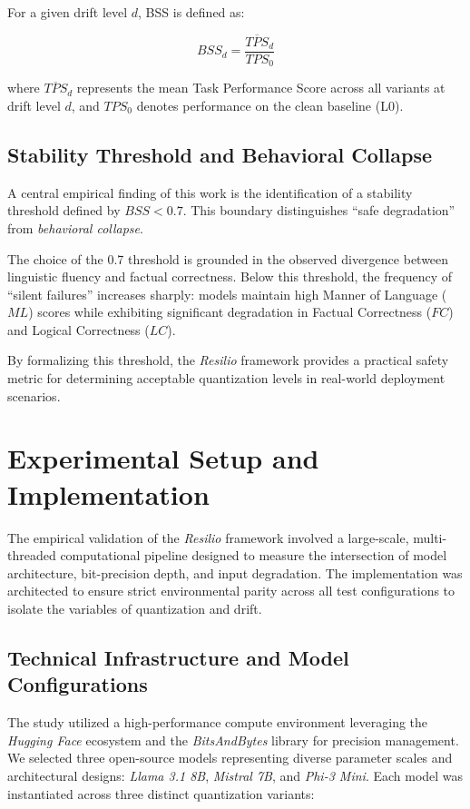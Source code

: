 \documentclass[conference]{IEEEtran}
\begin{document}
For a given drift level $d$, BSS is defined as:

\begin{equation}
BSS_d = \frac{\overline{TPS}_d}{TPS_0}
\end{equation}

where $\overline{TPS}_d$ represents the mean Task Performance Score across all variants at drift level $d$, and $TPS_0$ denotes performance on the clean baseline (L0).

\subsection{Stability Threshold and Behavioral Collapse}

A central empirical finding of this work is the identification of a stability threshold defined by $BSS < 0.7$. This boundary distinguishes ``safe degradation'' from \textit{behavioral collapse}.

The choice of the 0.7 threshold is grounded in the observed divergence between linguistic fluency and factual correctness. Below this threshold, the frequency of ``silent failures'' increases sharply: models maintain high Manner of Language ($ML$) scores while exhibiting significant degradation in Factual Correctness ($FC$) and Logical Correctness ($LC$).

By formalizing this threshold, the \textit{Resilio} framework provides a practical safety metric for determining acceptable quantization levels in real-world deployment scenarios.


\section{Experimental Setup and Implementation}

The empirical validation of the \textit{Resilio} framework involved a large-scale, multi-threaded computational pipeline designed to measure the intersection of model architecture, bit-precision depth, and input degradation. The implementation was architected to ensure strict environmental parity across all test configurations to isolate the variables of quantization and drift.

\subsection{Technical Infrastructure and Model Configurations}

The study utilized a high-performance compute environment leveraging the \textit{Hugging Face} ecosystem and the \textit{BitsAndBytes} library for precision management. We selected three open-source models representing diverse parameter scales and architectural designs: \textit{Llama 3.1 8B}, \textit{Mistral 7B}, and \textit{Phi-3 Mini}. Each model was instantiated across three distinct quantization variants:
\end{document}
